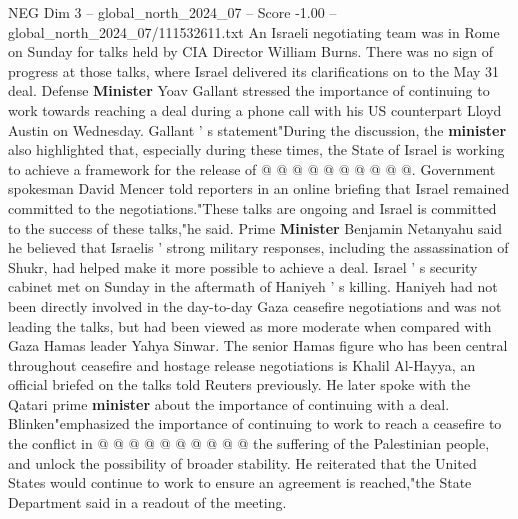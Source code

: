 \begin{textsample}{NEG Dim 3 – global\_north\_2024\_07 – Score -1.00 – global\_north\_2024\_07/111532611.txt}
An Israeli negotiating team was in Rome on Sunday for talks held by CIA Director William Burns.
There was no sign of progress at those talks, where Israel delivered its clarifications on to the May 31 deal.
Defense \textbf{Minister} Yoav Gallant stressed the importance of continuing to work towards reaching a deal during a phone call with his US counterpart Lloyd Austin on Wednesday.
Gallant ' s statement"During the discussion, the \textbf{minister} also highlighted that, especially during these times, the State of Israel is working to achieve a framework for the release of @ @ @ @ @ @ @ @ @ @.
Government spokesman David Mencer told reporters in an online briefing that Israel remained committed to the negotiations."These talks are ongoing and Israel is committed to the success of these talks,"he said.
Prime \textbf{Minister} Benjamin Netanyahu said he believed that Israelis ' strong military responses, including the assassination of Shukr, had helped make it more possible to achieve a deal.
Israel ' s security cabinet met on Sunday in the aftermath of Haniyeh ' s killing.
Haniyeh had not been directly involved in the day-to-day Gaza ceasefire negotiations and was not leading the talks, but had been viewed as more moderate when compared with Gaza Hamas leader Yahya Sinwar.
The senior Hamas figure who has been central throughout ceasefire and hostage release negotiations is Khalil Al-Hayya, an official briefed on the talks told Reuters previously.
He later spoke with the Qatari prime \textbf{minister} about the importance of continuing with a deal.
Blinken"emphasized the importance of continuing to work to reach a ceasefire to the conflict in @ @ @ @ @ @ @ @ @ @ the suffering of the Palestinian people, and unlock the possibility of broader stability.
He reiterated that the United States would continue to work to ensure an agreement is reached,"the State Department said in a readout of the meeting.

\end{textsample}
